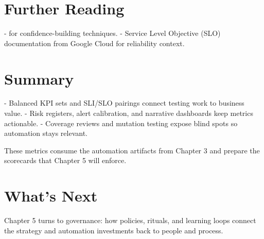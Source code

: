 \section{Further Reading}

- \citep{myers2011art} for confidence-building techniques.
- Service Level Objective (SLO) documentation from Google Cloud for reliability context.
\section{Summary}

- Balanced KPI sets and SLI/SLO pairings connect testing work to business value.
- Risk registers, alert calibration, and narrative dashboards keep metrics actionable.
- Coverage reviews and mutation testing expose blind spots so automation stays relevant.

These metrics consume the automation artifacts from Chapter 3 and prepare the scorecards that Chapter 5 will enforce.

\section{What's Next}

Chapter 5 turns to governance: how policies, rituals, and learning loops connect the strategy and automation investments back to people and process.
